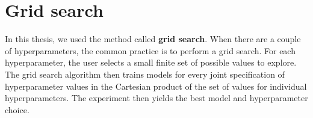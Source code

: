 \section{Grid search}
\label{section-grid-search}

In this thesis, we used the method called \textbf{grid search}\cite{grid-search}. When there are a couple of hyperparameters, the common practice
is to perform a grid search. For each hyperparameter, the user selects a
small finite set of possible values to explore. The grid search algorithm
then trains models for every joint specification of hyperparameter
values in the Cartesian product of the set of values for individual
hyperparameters. The experiment then yields the best model and hyperparameter choice. 




